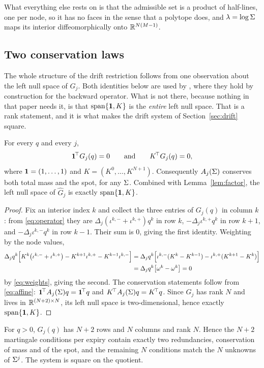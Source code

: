 What everything else rests on is that the admissible set is a product of
half-lines, one per node, so it has no faces in the sense that a polytope does,
and $\lambda=\log\Sigma$ maps its interior diffeomorphically onto $\mathbb R^{N(M-1)}$.


\subsection{Two conservation laws}\label{sec:conservation}

The whole structure of the drift restriction follows from one observation about
the left null space of $G_j$. Both identities below are used by \cite{BuehlerRyskin2016}, where they hold by
construction for the backward operator. What is not there, because nothing in
that paper needs it, is that $\mathrm{span}\{\mathbf 1,K\}$ is the \emph{entire} left
null space. That is a rank
statement, and it is what makes the drift system of Section~\ref{sec:drift}
square.

\begin{lemma}\label{lem:null}
For every $q$ and every $j$,
\[
  \mathbf 1^{\!\top}G_j(q)=0
  \qquad\text{and}\qquad
  K^{\!\top}G_j(q)=0 ,
\]
where $\mathbf 1=(1,\dots,1)$ and $K=(K^0,\dots,K^{N+1})$. Consequently $A_j(\Sigma)$
conserves both total mass and the spot, for any $\Sigma$. Combined with
Lemma~\ref{lem:factor}, the left null space of $\widehat G_j$ is exactly
$\mathrm{span}\{\mathbf 1,K\}$.
\end{lemma}

\begin{proof}
Fix an interior index $k$ and collect the three entries of $G_j(q)$ in column
$k$: from \eqref{eq:operator} they are $\Delta_j(\iota^{k,-}+\iota^{k,+})q^k$ in row
$k$, $-\Delta_j\iota^{k,+}q^k$ in row $k+1$, and $-\Delta_j\iota^{k,-}q^k$ in row $k-1$.
Their sum is $0$, giving the first identity. Weighting by the node values,
\begin{align*}
  \Delta_jq^k\Bigl[K^k\bigl(\iota^{k,-}+\iota^{k,+}\bigr)
   -K^{k+1}\iota^{k,+}-K^{k-1}\iota^{k,-}\Bigr]
  &=\Delta_jq^k\Bigl[\iota^{k,-}(K^k-K^{k-1})-\iota^{k,+}(K^{k+1}-K^k)\Bigr]\\
  &=\Delta_jq^k\bigl[\omega^k-\omega^k\bigr]=0
\end{align*}
by \eqref{eq:weights}, giving the second. The conservation statements follow
from \eqref{eq:affine}: $\mathbf 1^{\!\top}A_j(\Sigma)q=\mathbf 1^{\!\top}q$ and
$K^{\!\top}A_j(\Sigma)q=K^{\!\top}q$. Since $\widehat G_j$ has rank $N$ and lives
in $\mathbb R^{(N+2)\times N}$, its left null space is two-dimensional, hence exactly
$\mathrm{span}\{\mathbf 1,K\}$.
\end{proof}

\begin{remark}[Counting]\label{cor:counting}
For $q>0$, $G_j(q)$ has $N+2$ rows and $N$ columns and rank $N$. Hence the $N+2$ martingale
conditions per expiry contain exactly two redundancies, conservation of mass
and of the spot, and the remaining $N$ conditions match the $N$ unknowns
of $\Sigma^j$. The system is square on the quotient.
\end{remark}
